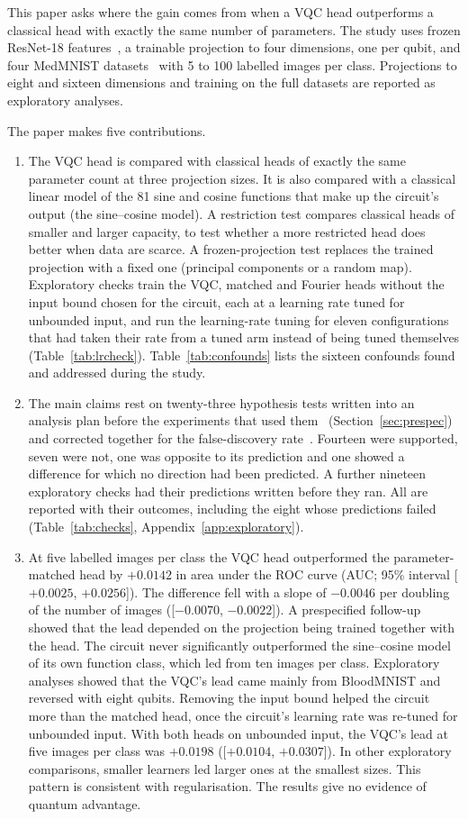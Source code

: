 \documentclass{ieeeaccess}
\newcommand{\vqc}{VQC}
\begin{document}
This paper asks where the gain comes from when a \vqc{} head outperforms a classical head with exactly the same number of parameters. The study uses frozen ResNet-18 features~\cite{he2016}, a trainable projection to four dimensions, one per qubit, and four MedMNIST datasets~\cite{yang2023} with 5 to 100 labelled images per class. Projections to eight and sixteen dimensions and training on the full datasets are reported as exploratory analyses.

The paper makes five contributions.
\begin{enumerate}
\item The \vqc{} head is compared with classical heads of exactly the same parameter count at three projection sizes. It is also compared with a classical linear model of the 81 sine and cosine functions that make up the circuit's output (the sine--cosine model). A restriction test compares classical heads of smaller and larger capacity, to test whether a more restricted head does better when data are scarce. A frozen-projection test replaces the trained projection with a fixed one (principal components or a random map). Exploratory checks train the \vqc{}, matched and Fourier heads without the input bound chosen for the circuit, each at a learning rate tuned for unbounded input, and run the learning-rate tuning for eleven configurations that had taken their rate from a tuned arm instead of being tuned themselves (Table~\ref{tab:lrcheck}). Table~\ref{tab:confounds} lists the sixteen confounds found and addressed during the study.
\item The main claims rest on twenty-three hypothesis tests written into an analysis plan before the experiments that used them~\cite{nosek2018} (Section~\ref{sec:prespec}) and corrected together for the false-discovery rate~\cite{benjamini1995}. Fourteen were supported, seven were not, one was opposite to its prediction and one showed a difference for which no direction had been predicted. A further nineteen exploratory checks had their predictions written before they ran. All are reported with their outcomes, including the eight whose predictions failed (Table~\ref{tab:checks}, Appendix~\ref{app:exploratory}).
\item At five labelled images per class the \vqc{} head outperformed the parameter-matched head by $+0.0142$ in area under the ROC curve (AUC; 95\% interval [$+0.0025$, $+0.0256$]). The difference fell with a slope of $-0.0046$ per doubling of the number of images ([$-0.0070$, $-0.0022$]). A prespecified follow-up showed that the lead depended on the projection being trained together with the head. The circuit never significantly outperformed the sine--cosine model of its own function class, which led from ten images per class. Exploratory analyses showed that the \vqc{}'s lead came mainly from BloodMNIST and reversed with eight qubits. Removing the input bound helped the circuit more than the matched head, once the circuit's learning rate was re-tuned for unbounded input. With both heads on unbounded input, the \vqc{}'s lead at five images per class was $+0.0198$ ([$+0.0104$, $+0.0307$]). In other exploratory comparisons, smaller learners led larger ones at the smallest sizes. This pattern is consistent with regularisation. The results give no evidence of quantum advantage.

\end{enumerate}
\end{document}
